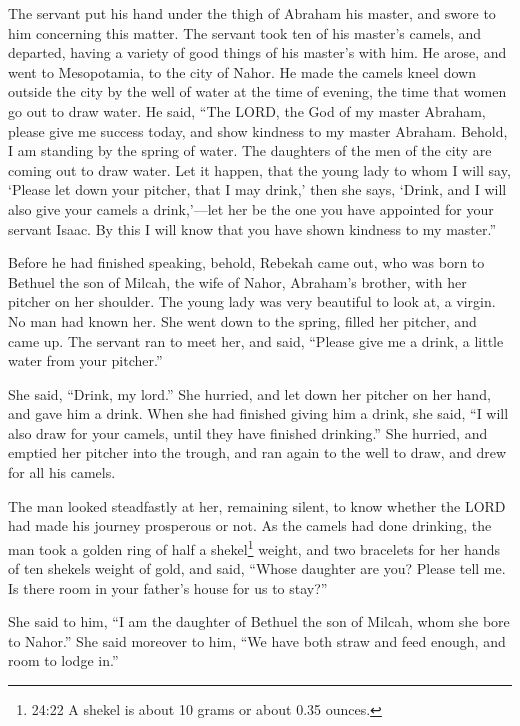  The servant put his hand under the thigh of Abraham his
master, and swore to him concerning this matter.  The
servant took ten of his master's camels, and departed, having a variety
of good things of his master's with him. He arose, and went to
Mesopotamia, to the city of Nahor.  He made the camels
kneel down outside the city by the well of water at the time of evening,
the time that women go out to draw water.  He said, ``The
LORD, the God of my master Abraham, please give me success today, and
show kindness to my master Abraham.  Behold, I am standing
by the spring of water. The daughters of the men of the city are coming
out to draw water.  Let it happen, that the young lady to
whom I will say, `Please let down your pitcher, that I may drink,' then
she says, `Drink, and I will also give your camels a drink,'---let her
be the one you have appointed for your servant Isaac. By this I will
know that you have shown kindness to my master.''

 Before he had finished speaking, behold, Rebekah came out,
who was born to Bethuel the son of Milcah, the wife of Nahor, Abraham's
brother, with her pitcher on her shoulder.  The young lady
was very beautiful to look at, a virgin. No man had known her. She went
down to the spring, filled her pitcher, and came up.  The
servant ran to meet her, and said, ``Please give me a drink, a little
water from your pitcher.''

 She said, ``Drink, my lord.'' She hurried, and let down
her pitcher on her hand, and gave him a drink.  When she
had finished giving him a drink, she said, ``I will also draw for your
camels, until they have finished drinking.''  She hurried,
and emptied her pitcher into the trough, and ran again to the well to
draw, and drew for all his camels.

 The man looked steadfastly at her, remaining silent, to
know whether the LORD had made his journey prosperous or not.
 As the camels had done drinking, the man took a golden
ring of half a shekel\footnote{24:22 A shekel is about 10 grams or about
  0.35 ounces.} weight, and two bracelets for her hands of ten shekels
weight of gold,  and said, ``Whose daughter are you? Please
tell me. Is there room in your father's house for us to stay?''

 She said to him, ``I am the daughter of Bethuel the son of
Milcah, whom she bore to Nahor.''  She said moreover to
him, ``We have both straw and feed enough, and room to lodge in.''

